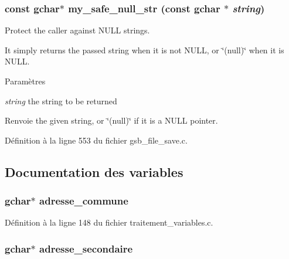 \subsubsection[{my\_\-safe\_\-null\_\-str}]{\setlength{\rightskip}{0pt plus 5cm}const gchar$\ast$ my\_\-safe\_\-null\_\-str (const gchar $\ast$ {\em string})}\label{gsb__file__save_8c_afab094df64a133cffdeb914484e1e52d}
Protect the caller against NULL strings.

It simply returns the passed string when it is not NULL, or \char`\"{}(null)\char`\"{} when it is NULL.


\begin{DoxyParams}{Paramètres}
\item[{\em string}]the string to be returned\end{DoxyParams}
\begin{DoxyReturn}{Renvoie}
the given string, or \char`\"{}(null)\char`\"{} if it is a NULL pointer. 
\end{DoxyReturn}


Définition à la ligne 553 du fichier gsb\_\-file\_\-save.c.



\subsection{Documentation des variables}
\subsubsection[{adresse\_\-commune}]{\setlength{\rightskip}{0pt plus 5cm}gchar$\ast$ {\bf adresse\_\-commune}}\label{gsb__file__save_8c_ab7ec5b8a1b4dca10b71bfe0364eb7248}


Définition à la ligne 148 du fichier traitement\_\-variables.c.

\subsubsection[{adresse\_\-secondaire}]{\setlength{\rightskip}{0pt plus 5cm}gchar$\ast$ {\bf adresse\_\-secondaire}}\label{gsb__file__save_8c_a5495a13fee46daf1634623fe4e63f99a}


